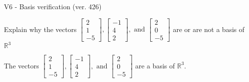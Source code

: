 \begin{exercise}
  \begin{exerciseTitle}V6 - Basis verification (ver. 426)\end{exerciseTitle}
  \begin{exerciseStatement}
    Explain why the vectors \(\left[\begin{array}{r}
2 \\
1 \\
-5
\end{array}\right] , \left[\begin{array}{r}
-1 \\
4 \\
2
\end{array}\right] , \text{ and } \left[\begin{array}{r}
2 \\
0 \\
-5
\end{array}\right]\) are or are not a basis of \(\mathbb{R}^3\)	


  \end{exerciseStatement}
  \begin{exerciseAnswer}
   The vectors \(\left[\begin{array}{r}
2 \\
1 \\
-5
\end{array}\right] , \left[\begin{array}{r}
-1 \\
4 \\
2
\end{array}\right] , \text{ and } \left[\begin{array}{r}
2 \\
0 \\
-5
\end{array}\right]\) 
  	 are  a basis of \(\mathbb{R}^3\).
  


  \end{exerciseAnswer}
\end{exercise}